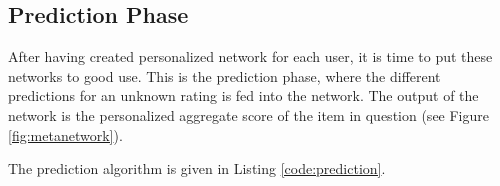 \subsection{Prediction Phase}

After having created personalized network for each user, it is time to put these networks to good use.
This is the prediction phase, where the different predictions for an unknown rating is fed into the network.
The output of the network is the personalized aggregate score of the item in question
(see Figure \ref{fig:metanetwork}).



The prediction algorithm is given in Listing \ref{code:prediction}.

\begin{figure*}
  
\end{figure*}


